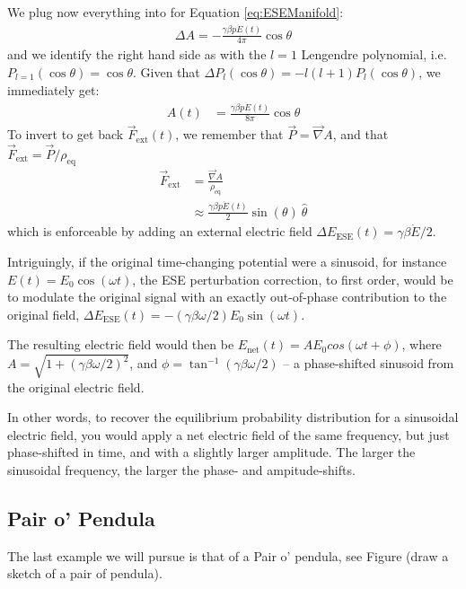 \documentclass[%
 reprint,
 amsmath,amssymb,
 aps,
]{revtex4-2}
\begin{document}
We plug now everything into for Equation \ref{eq:ESEManifold}:
\begin{align}
    \Delta A = -\frac{\gamma \beta p \dot{E}(t)}{4\pi} \cos \theta
\end{align}
and we identify the right hand side as with the $l = 1$ Lengendre polynomial, i.e. $P_{l = 1}(\cos \theta) = \cos \theta$. Given that $\Delta P_{l}(\cos \theta) = -l(l+1) P_{l}(\cos \theta)$, we immediately get:
\begin{align}
    A(t) &= \frac{\gamma \beta p \dot{E}(t)}{8\pi} \cos \theta
\end{align}
To invert to get back $\vec{F}_{\mathrm{ext}}(t)$, we remember that $\vec{P} =  \vec{\nabla} A$, and that $\vec{F}_{\mathrm{ext}} = \vec{P} / \rho_{\mathrm{eq}} $
\begin{align}
    \vec{F}_{\mathrm{ext}} &= \frac{\vec{\nabla} A}{\rho_{\mathrm{eq}}} \\
    &\approx \frac{\gamma \beta p \dot{E}(t)}{2} \sin (\theta) \ \hat{\theta}
\end{align}
which is enforceable by adding an external electric field $\Delta E_{\mathrm{ESE}}(t) = \gamma \beta \dot{E} / 2$.

Intriguingly, if the original time-changing potential were a sinusoid, for instance $E(t) = E_0 \cos (\omega t)$, the ESE perturbation correction, to first order, would be to modulate the original signal with an exactly out-of-phase contribution to the original field,  $\Delta E_{\mathrm{ESE}}(t) = -(\gamma \beta \omega / 2) E_0 \sin (\omega t) $.

The resulting electric field would then be $E_{\mathrm{net}}(t) = A E_0 cos(\omega t + \phi) $, where $A = \sqrt{1 + (\gamma \beta \omega / 2)^2 }$, and $\phi = \tan^{-1}(\gamma \beta \omega / 2)$ -- a phase-shifted sinusoid from the original electric field.

In other words, to recover the equilibrium probability distribution for a sinusoidal electric field, you would apply a net electric field of the same frequency, but just phase-shifted in time, and with a slightly larger amplitude. The larger the sinusoidal frequency, the larger the phase- and ampitude-shifts.

\subsection{Pair o' Pendula}

The last example we will pursue is that of a Pair o' pendula, see Figure (draw a sketch of a pair of pendula).
\end{document}

